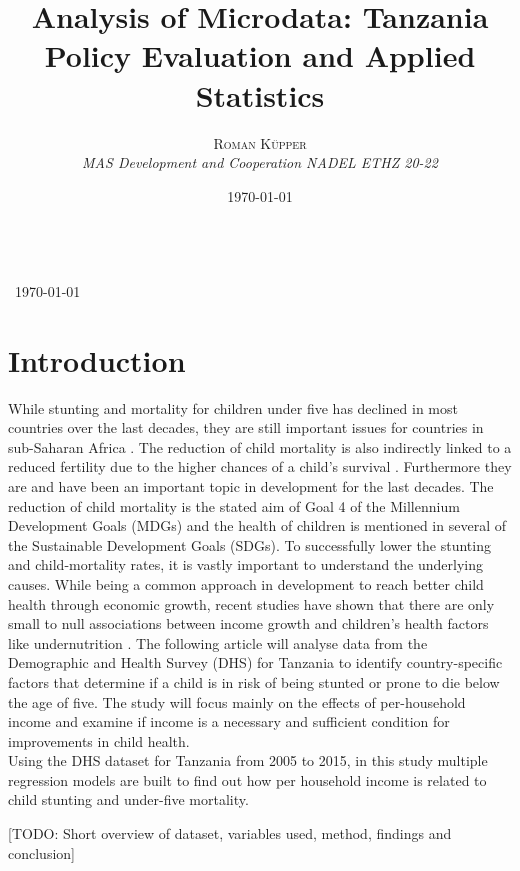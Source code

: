 \documentclass[a4paper, 11pt]{article} %
\title{\textbf{Analysis of Microdata: Tanzania}\\ %
Policy Evaluation and Applied Statistics } %
\author{\textsc{Roman Küpper} %
\\{\textit{MAS Development and Cooperation NADEL ETHZ 20-22}}} %
\date{\today} %
\makeatletter
\renewcommand{\maketitle}{ %
\begin{flushright} %
{\LARGE\@title} %
\vspace{50pt} %

{\large\@author} %
\\\ \today %

\vspace{40pt} %
\end{flushright}
}
\makeatother
\begin{document}
\maketitle %



\section{Introduction}
While stunting and mortality for children under five has declined in most countries over the last decades, they are still important issues for countries in sub-Saharan Africa \cite{Nshimyiryo2019Dec}. The reduction of child mortality is also indirectly linked to a reduced fertility due to the higher chances of a child's survival \cite{uddin2009}. Furthermore they are and have been an important topic in development for the last decades. The reduction of child mortality is the stated aim of Goal 4 of the Millennium Development Goals (MDGs) and the health of children is mentioned in several of the Sustainable Development Goals (SDGs). To successfully lower the stunting and child-mortality rates, it is vastly important to understand the underlying causes. While being a common approach in development to reach better child health through economic growth, recent studies have shown that there are only small to null associations between income growth and children's health factors like undernutrition \cite{Vollmer2014Apr}. The following article will analyse data from the Demographic and Health Survey (DHS) for Tanzania to identify country-specific factors that determine if a child is in risk of being stunted or prone to die below the age of five. The study will focus mainly on the effects of per-household income and examine if income is a necessary and sufficient condition for improvements in child health. \\

Using the DHS dataset for Tanzania from 2005 to 2015, in this study multiple regression models are built to find out how per household income is related to child stunting and under-five mortality. 

[TODO: Short overview of dataset, variables used, method, findings and conclusion]
\end{document}
